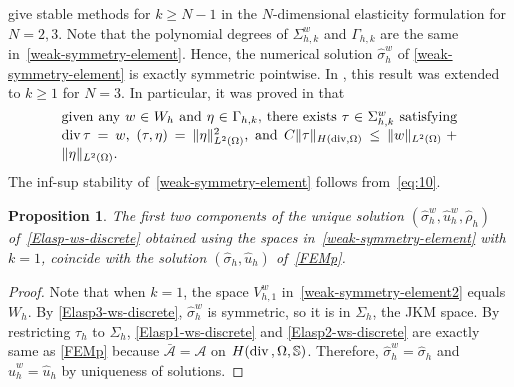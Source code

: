 \documentclass[12pt]{amsart}
\numberwithin{equation}{section}
\newtheorem{proposition}[theorem]{Proposition}
\theoremstyle{definition}
\theoremstyle{remark}
\renewcommand{\(}{\bigl(}
\renewcommand{\)}{\bigr)}
\renewcommand\div{\operatorname{div}}
\newcommand{\uu}{\hat{u}}  %
\newcommand{\ssigma}{\hat{\sigma}}   %
\newcommand{\dive}{{\ensuremath\mathop{\mathrm{div}\,}}} %
\newcommand{\Aa}{\mathcal{A}}
\newcommand{\SW}{\Sigma^w}
\newcommand{\VW}{V^w}
\begin{document}
give stable methods
for $k\ge N-1$ in the $N$-dimensional elasticity formulation for $N=2,3$.
Note that the polynomial degrees of $\SW_{h,k}$ and $\Gamma_{h,k}$ are the same in~\eqref{weak-symmetry-element}. Hence, the numerical solution $\ssigma_h^{w}$ of \eqref{weak-symmetry-element} is exactly symmetric pointwise. In \cite[Subsection~4.2.3]{lee2016weaksymmetry}, this result was extended to $k\ge 1$ for $N=3$.
In particular, it was proved in  \cite{lee2016weaksymmetry} that
\begin{equation}
  \label{eq:10}
  \parbox{0.82\textwidth}{
    given any $w \in W_h$ and  $\eta\in \Gamma_{h,k},$
    there exists $\tau \in \SW_{h,k}$ satisfying $\dive \tau = w$,
    $(\tau, \eta) = \| \eta \|_{L^2(\Omega)}^2$,    and
    $C\| \tau \|_{H(\div,\Omega)} \le
    \| w \|_{L^2(\Omega)} + \| \eta \|_{L^2(\Omega)}$.}
\end{equation}
The inf-sup stability of~\eqref{weak-symmetry-element} follows from~\eqref{eq:10}.


\begin{proposition}
  \label{prop:ws-1}
  The first two components of the unique solution
  $(\ssigma_h^{w}, \uu_h^{w}, \hat{\rho}_h)$
  of~\eqref{Elasp-ws-discrete} obtained
  using the spaces in~\eqref{weak-symmetry-element} with 
  $k=1$, coincide with the solution $(\ssigma_h,
  \uu_h)$ of~\eqref{FEMp}.
\end{proposition}
\begin{proof}
  Note that when $k=1$, the space $\VW_{h,1}$ in~\eqref{weak-symmetry-element2} equals $W_h$. By \eqref{Elasp3-ws-discrete}, $\ssigma_h^{w}$ is symmetric, so it
  is in $\Sigma_h$, the JKM space. By
  restricting $\tau_h$ to $\Sigma_h$, \eqref{Elasp1-ws-discrete} and
  \eqref{Elasp2-ws-discrete} are exactly same as \eqref{FEMp} because
  $\bar{\Aa}=\Aa$ on $H(\dive, \Omega, \mathbb{S})$. Therefore,
  $\ssigma_h^{w}=\ssigma_h$ and $\uu_h^{w} =\uu_h$ by uniqueness of
  solutions.
\end{proof}
\end{document}
